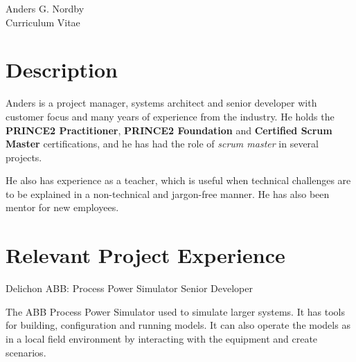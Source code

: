 \documentclass[10pt]{article} %
\begin{document}
\begin{paracol}{2} %


\parbox[top][0.12\textheight][c]{\linewidth}{ %
	\vspace{-0.04\textheight} %
	\centering %
	{\sffamily\Huge Anders G. Nordby}\\\medskip %
	{\Huge\color{headings}\cvtextfont Curriculum Vitae}
}


\section{Description}

Anders is a project manager, systems architect and senior developer with customer focus and many years of
experience from the industry. He holds the \textbf{PRINCE2 Practitioner}, \textbf{PRINCE2 Foundation} and
\textbf{Certified Scrum Master} certifications, and he has had the role of \textit{scrum master} in several projects.
\medskip

He also has experience as a teacher, which is useful when technical challenges are to be explained 
in a non-technical and jargon-free manner. He has also been mentor for new employees.
\medskip


\section{Relevant Project Experience}

{Delichon} %
{ABB: Process Power Simulator} 
{Senior Developer} 
{The ABB Process Power Simulator used to simulate larger systems. It has tools for building, configuration and running models. 
It can also operate the models as in a local field environment by interacting with the equipment and create scenarios.

}
\end{paracol}
\end{document}
